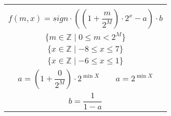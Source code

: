 \documentclass[12pt]{standalone}
\begin{document}
    \begin{minipage}{9cm}

        \begin{tabular}{|c|}
        \hline
        \\

            \vbox{\begin{equation*}
            f(m, x) = sign \cdot ((1 + \frac{m}{2^{M}}) \cdot 2^{x} - a) \cdot b
            \end{equation*}}

        \\

            \vbox{\begin{equation*}
            \{ m \in \mathbb{Z} \mid 0 \leq m < 2^{M} \}
            \end{equation*}}

        \\

            \vbox{\begin{equation*}\tag{4 bits}
            \{ x \in \mathbb{Z} \mid -8 \leq x \leq 7 \}
            \end{equation*}}

        \\

            \vbox{\begin{equation*}\tag{3 bits}
            \{ x \in \mathbb{Z} \mid -6 \leq x \leq 1 \}
            \end{equation*}}

        \\

            \vbox{\begin{equation*}
            a = (1 + \frac{0}{2^{M}}) \cdot 2^{\min{X}}
            \quad \quad
            a = 2^{\min{X}}
            \end{equation*}}

        \\

            \vbox{\begin{equation*}
            b = \frac{1}{1 - a}
            \end{equation*}}

        \\
        \hline
        \end{tabular}

    \end{minipage}
\end{document}
